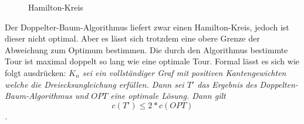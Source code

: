 \documentclass{article}
\begin{document}
\begin{figure}[H]
\centering
{}
\caption{Hamilton-Kreis}
\label{fig:ursprungs-graf-hamiltonkreis}
\end{figure}

Der Doppelter-Baum-Algorithmus liefert zwar einen Hamilton-Kreis, jedoch ist dieser nicht optimal. Aber es lässt sich trotzdem eine obere Grenze der Abweichung zum Optimum bestimmen. Die durch den Algorithmus bestimmte Tour ist maximal doppelt so lang wie eine optimale Tour. Formal lässt es sich wie folgt ausdrücken:
\textit{$K_n$ sei ein vollständiger Graf mit positiven Kantengewichten welche die Dreiecksungleichung erfüllen. Dann sei $T'$ das Ergebnis des Doppelten-Baum-Algorithmus und $OPT$ eine optimale Lösung. Dann gilt
\begin{displaymath}
c(T') \leq 2 * c(OPT)
\end{displaymath}
.}

\end{document}
